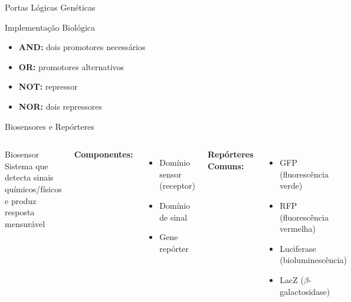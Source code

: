 \begin{frame}{Portas Lógicas Genéticas}
\vspace{0.5cm}

\begin{exampleblock}{Implementação Biológica}
\begin{itemize}
    \item \textbf{AND:} dois promotores necessários
    \item \textbf{OR:} promotores alternativos
    \item \textbf{NOT:} repressor
    \item \textbf{NOR:} dois repressores
\end{itemize}
\end{exampleblock}
\end{frame}

\begin{frame}{Biosensores e Repórteres}
\begin{columns}
\begin{block}{Biosensor}
Sistema que detecta sinais químicos/físicos e produz resposta mensurável
\end{block}

\textbf{Componentes:}
\begin{itemize}
    \item Domínio sensor (receptor)
    \item Domínio de sinal
    \item Gene repórter
\end{itemize}

\vspace{0.3cm}

\textbf{Repórteres Comuns:}
\begin{itemize}
    \item GFP (fluorescência verde)
    \item RFP (fluorescência vermelha)
    \item Luciferase (bioluminescência)
    \item LacZ ($\beta$-galactosidase)
\end{itemize}

\begin{center}
\end{center}
\end{columns}
\end{frame}
